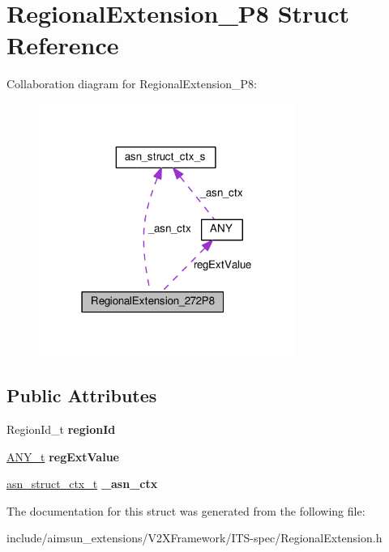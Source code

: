 \hypertarget{structRegionalExtension__272P8}{}\section{Regional\+Extension\+\_\+P8 Struct Reference}
\label{structRegionalExtension__272P8}


Collaboration diagram for Regional\+Extension\+\_\+P8\+:\nopagebreak
\begin{figure}[H]
\begin{center}
\leavevmode
\includegraphics[width=238pt]{structRegionalExtension__272P8__coll__graph}
\end{center}
\end{figure}
\subsection*{Public Attributes}
\begin{DoxyCompactItemize}
\item 
Region\+Id\+\_\+t {\bfseries region\+Id}\hypertarget{structRegionalExtension__272P8_af6890e9c72efdd911845b9c17254c40d}{}\label{structRegionalExtension__272P8_af6890e9c72efdd911845b9c17254c40d}

\item 
\hyperlink{structANY}{A\+N\+Y\+\_\+t} {\bfseries reg\+Ext\+Value}\hypertarget{structRegionalExtension__272P8_ab9495acae2f2187bb510bba91ecd12f1}{}\label{structRegionalExtension__272P8_ab9495acae2f2187bb510bba91ecd12f1}

\item 
\hyperlink{structasn__struct__ctx__s}{asn\+\_\+struct\+\_\+ctx\+\_\+t} {\bfseries \+\_\+asn\+\_\+ctx}\hypertarget{structRegionalExtension__272P8_a3e2117bdfca275587476584e2ed1d28a}{}\label{structRegionalExtension__272P8_a3e2117bdfca275587476584e2ed1d28a}

\end{DoxyCompactItemize}


The documentation for this struct was generated from the following file\+:\begin{DoxyCompactItemize}
\item 
include/aimsun\+\_\+extensions/\+V2\+X\+Framework/\+I\+T\+S-\/spec/Regional\+Extension.\+h\end{DoxyCompactItemize}
